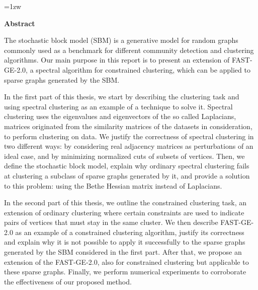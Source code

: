 \maketitle
\thispagestyle{empty}
\newpage

\thispagestyle{empty}
\vspace*{20pt plus 1fil}
\parindent=1zw
\noindent
%
%
\begin{center}
{\Large \bf Abstract}
\vspace{2cm}
\end{center}
The stochastic block model (SBM) is a generative model for random graphs commonly used as a benchmark for different community detection and clustering algorithms.
Our main purpose in this report is to present an extension of FAST-GE-2.0, a spectral algorithm for constrained clustering, which can be applied to sparse graphs generated by the SBM.

In the first part of this thesis,
we start by describing the clustering task and using spectral clustering as an example of a technique to solve it.
Spectral clustering uses the eigenvalues and eigenvectors of the so called Laplacians, matrices originated from the similarity matrices of the datasets in consideration, to perform clustering on data.
We justify the correctness of spectral clustering in two different ways: by considering real adjacency matrices as perturbations of an ideal case, and by minimizing normalized cuts of subsets of vertices.
Then, we define the stochastic block model, explain why ordinary spectral clustering fails at clustering a subclass of sparse graphs generated by it, and provide a solution to this problem: using the Bethe Hessian matrix instead of Laplacians.

In the second part of this thesis,
we outline the constrained clustering task, an extension of ordinary clustering where certain constraints are used to indicate pairs of vertices that must stay in the same cluster.
We then describe FAST-GE-2.0 as an example of a constrained clustering algorithm, justify its correctness and explain why it is not possible to apply it successfully to the sparse graphs generated by the SBM considered in the first part.
After that, we propose an extension of the FAST-GE-2.0, also for constrained clustering but applicable to these sparse graphs. 
Finally, we perform numerical experiments to corroborate the effectiveness of our proposed method.



